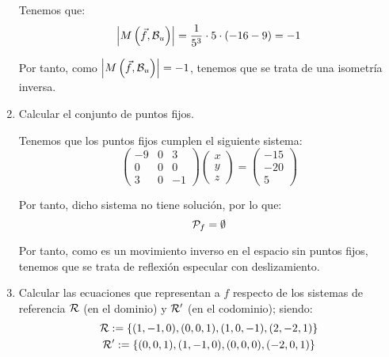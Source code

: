 \documentclass[12pt]{article}
\begin{document}
\begin{ejercicio}[4 puntos]
\begin{enumerate}
            Tenemos que:
            \begin{equation*}
                \left|M\left(\vec{f}, \mathcal{B}_u\right)\right|
                = \frac{1}{5^3}\cdot 5 \cdot (-16-9) = -1
            \end{equation*}

            Por tanto, como $\left|M\left(\vec{f}, \mathcal{B}_u\right)\right|=-1$, tenemos que se trata de una isometría inversa.

            \item Calcular el conjunto de puntos fijos.
            
            Tenemos que los puntos fijos cumplen el siguiente sistema:
            \begin{equation*}
                \begin{pmatrix}
                    -9 & 0 & 3\\
                    0 & 0 & 0\\
                    3 & 0 & -1
                \end{pmatrix}
                \begin{pmatrix}
                    x\\y\\z
                \end{pmatrix}
                =
                \begin{pmatrix}
                    -15\\-20\\5
                \end{pmatrix}
            \end{equation*}

            Por tanto, dicho sistema no tiene solución, por lo que:
            \begin{equation*}
                \mathcal{P}_f = \emptyset
            \end{equation*}

            Por tanto, como es un movimiento inverso en el espacio sin puntos fijos,
            tenemos que se trata de reflexión especular con deslizamiento.

            \item Calcular las ecuaciones que representan a $f$ respecto de los sistemas de referencia $\mathcal{R}$ (en el dominio) y $\mathcal{R}'$ (en el codominio); siendo:
            \begin{gather*}
                \mathcal{R}:=\{(1,-1,0), (0,0,1), (1,0,-1), (2,-2,1)\}\\
                \mathcal{R}':=\{(0,0,1), (1,-1,0), (0,0,0), (-2,0,1)\}
            \end{gather*}


\end{enumerate}
\end{ejercicio}
\end{document}
